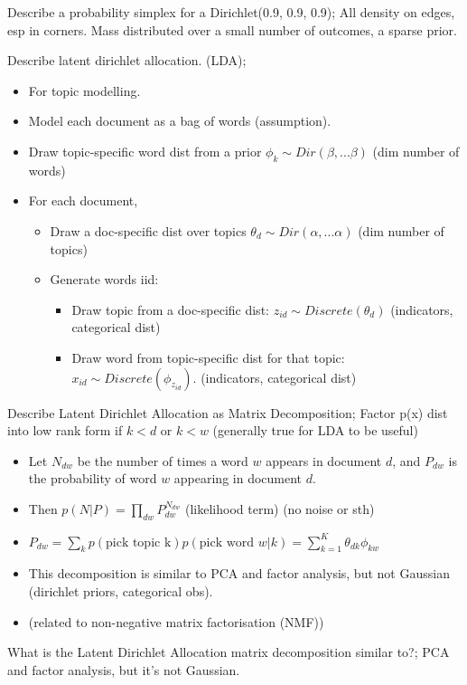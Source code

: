 \documentclass{article}
\begin{document}
Describe a probability simplex for a Dirichlet(0.9, 0.9, 0.9); All density on edges, esp in corners. Mass distributed over a small number of outcomes, a sparse prior.

Describe latent dirichlet allocation. (LDA); \begin{itemize} \item For topic modelling.  \item Model each document as a bag of words (assumption). \item Draw topic-specific word dist from a prior $\phi_k\sim Dir(\beta, ...\beta)$ (dim number of words) \item For each document, \begin{itemize} \item Draw a doc-specific dist over topics $\theta_d \sim Dir(\alpha, ...\alpha)$ (dim number of topics) \item Generate words iid: \begin{itemize} \item Draw topic from a doc-specific dist: $z_{id}\sim Discrete (\theta_d)$ (indicators, categorical dist) \item Draw word from topic-specific dist for that topic: $x_{id}\sim Discrete(\phi_{z_{id}})$. (indicators, categorical dist) \end{itemize} \end{itemize} \end{itemize}

Describe Latent Dirichlet Allocation as Matrix Decomposition; Factor p(x) dist into low rank form  if $k<d$ or $k<w$  (generally true for LDA to be useful) \begin{itemize} \item Let $N_{dw}$ be the number of times a word $w$ appears in document $d$, and $P_{dw}$ is the probability of word $w$ appearing in document $d$. \item Then $p(N|P)=\prod_{dw}P^{N_{dw}}_{dw}$ (likelihood term) (no noise or sth) \item $P_{dw}=\sum_k p(\text{pick topic k})p(\text{pick word }w|k)=\sum_{k=1}^K\theta_{dk}\phi_{kw}$ \item This decomposition is similar to PCA and factor analysis, but not Gaussian (dirichlet priors, categorical obs). \item (related to non-negative matrix factorisation (NMF)) \end{itemize}

What is the Latent Dirichlet Allocation matrix decomposition similar to?; PCA and factor analysis, but it's not Gaussian.
\end{document}
